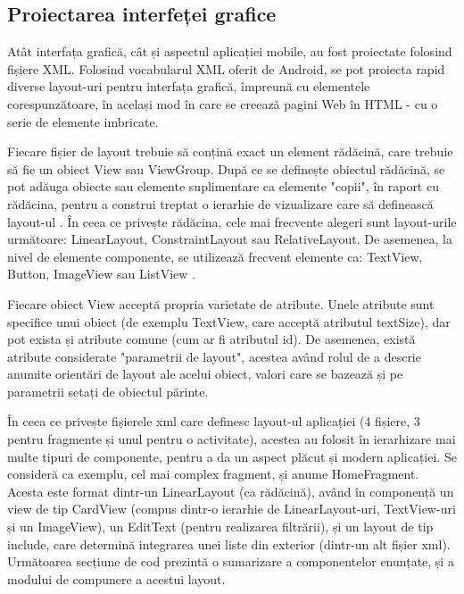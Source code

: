 \documentclass[a4paper,12pt]{report}
\begin{document}
\iffalse
\newpage
\subsection{Proiectarea interfeței grafice}
Atât interfața grafică, cât și aspectul aplicației mobile,
au fost proiectate folosind fișiere XML. Folosind vocabularul 
XML oferit de Android, se pot proiecta rapid diverse layout-uri 
pentru interfața grafică, împreună cu elementele corespunzătoare,
în același mod în care se creează pagini Web în HTML - cu o serie 
de elemente imbricate.

Fiecare fișier de layout trebuie să conțină exact un element 
rădăcină, care trebuie să fie un obiect View sau ViewGroup.
După ce se definește obiectul rădăcină, se pot adăuga obiecte 
sau elemente suplimentare ca elemente "copii", în 
raport cu rădăcina, pentru a construi treptat o 
ierarhie de vizualizare care să definească layout-ul \cite{WEBSITE:android-layouts}.
În ceea ce privește rădăcina, cele mai frecvente alegeri 
sunt layout-urile următoare: LinearLayout, ConstraintLayout 
sau RelativeLayout. De asemenea, la nivel de elemente 
componente, se utilizează frecvent elemente ca: 
TextView, Button, ImageView sau ListView \cite{WEBSITE:android-layouts}. 

Fiecare obiect View acceptă propria varietate de atribute.
Unele atribute sunt specifice unui obiect (de exemplu TextView, care 
acceptă atributul textSize), dar pot exista și atribute 
comune (cum ar fi atributul id). De asemenea, există atribute 
considerate "parametrii de layout", acestea având rolul de a descrie 
anumite orientări de layout ale acelui obiect, valori care se bazează 
și pe parametrii setați de obiectul părinte.

În ceea ce privește fișierele xml care definesc 
layout-ul aplicației (4 fișiere, 3 pentru fragmente și 
unul pentru o activitate), acestea au folosit în 
ierarhizare mai multe tipuri de componente, 
pentru a da un aspect plăcut și modern aplicației.
Se consideră ca exemplu, cel mai complex fragment, și 
anume HomeFragment. Acesta este format dintr-un 
LinearLayout (ca rădăcină), având în componență un view de tip 
CardView (compus dintr-o ierarhie de LinearLayout-uri, TextView-uri 
și un ImageView), un EditText (pentru realizarea filtrării), și un 
layout de tip include, care determină integrarea unei liste din 
exterior (dintr-un alt fișier xml). Următoarea secțiune de cod prezintă 
o sumarizare a componentelor enunțate, și a modului de compunere a acestui 
layout.
\end{document}
